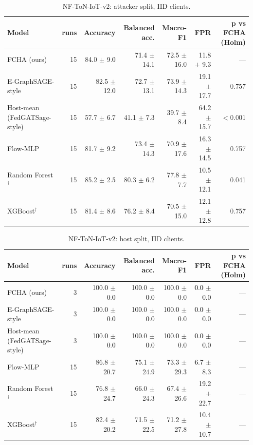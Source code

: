 \begin{table}[t]
\centering
\caption{NF-ToN-IoT-v2: attacker split, IID clients.}
\label{tab:nf_ton_iot_v2_attacker}
\begin{tabular}{lrrrrrr}
\toprule
Model & runs & Accuracy & Balanced acc. & Macro-F1 & FPR & p vs FCHA (Holm) \\
\midrule
FCHA (ours) & 15 & 84.0 $\pm$ 9.0 & 71.4 $\pm$ 14.1 & 72.5 $\pm$ 16.0 & 11.8 $\pm$ 9.3 & — \\
E-GraphSAGE-style & 15 & 82.5 $\pm$ 12.0 & 72.7 $\pm$ 13.1 & 73.9 $\pm$ 14.3 & 19.1 $\pm$ 17.7 & 0.757 \\
Host-mean (FedGATSage-style) & 15 & 57.7 $\pm$ 6.7 & 41.1 $\pm$ 7.3 & 39.7 $\pm$ 8.4 & 64.2 $\pm$ 15.7 & $<$0.001 \\
Flow-MLP & 15 & 81.7 $\pm$ 9.2 & 73.4 $\pm$ 14.3 & 70.9 $\pm$ 17.6 & 16.3 $\pm$ 14.5 & 0.757 \\
Random Forest$^\dagger$ & 15 & 85.2 $\pm$ 2.5 & 80.3 $\pm$ 6.2 & 77.8 $\pm$ 7.7 & 10.5 $\pm$ 12.1 & 0.041 \\
XGBoost$^\dagger$ & 15 & 81.4 $\pm$ 8.6 & 76.2 $\pm$ 8.4 & 70.5 $\pm$ 15.0 & 12.1 $\pm$ 12.8 & 0.757 \\
\bottomrule
\end{tabular}
\end{table}

\begin{table}[t]
\centering
\caption{NF-ToN-IoT-v2: host split, IID clients.}
\label{tab:nf_ton_iot_v2_host}
\begin{tabular}{lrrrrrr}
\toprule
Model & runs & Accuracy & Balanced acc. & Macro-F1 & FPR & p vs FCHA (Holm) \\
\midrule
FCHA (ours) & 3 & 100.0 $\pm$ 0.0 & 100.0 $\pm$ 0.0 & 100.0 $\pm$ 0.0 & 0.0 $\pm$ 0.0 & — \\
E-GraphSAGE-style & 3 & 100.0 $\pm$ 0.0 & 100.0 $\pm$ 0.0 & 100.0 $\pm$ 0.0 & 0.0 $\pm$ 0.0 & — \\
Host-mean (FedGATSage-style) & 3 & 100.0 $\pm$ 0.0 & 100.0 $\pm$ 0.0 & 100.0 $\pm$ 0.0 & 0.0 $\pm$ 0.0 & — \\
Flow-MLP & 15 & 86.8 $\pm$ 20.7 & 75.1 $\pm$ 24.9 & 73.3 $\pm$ 29.3 & 6.7 $\pm$ 8.3 & — \\
Random Forest$^\dagger$ & 15 & 76.8 $\pm$ 24.7 & 66.0 $\pm$ 24.3 & 67.4 $\pm$ 26.6 & 19.2 $\pm$ 22.7 & — \\
XGBoost$^\dagger$ & 15 & 82.4 $\pm$ 20.2 & 71.5 $\pm$ 22.5 & 71.2 $\pm$ 27.8 & 10.4 $\pm$ 10.7 & — \\
\bottomrule
\end{tabular}
\end{table}

